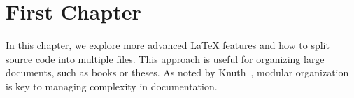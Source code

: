 \section{First Chapter}

In this chapter, we explore more advanced LaTeX features and how to split source code into multiple files. This approach is useful for organizing large documents, such as books or theses. As noted by Knuth~\cite{knuth1984}, modular organization is key to managing complexity in documentation.